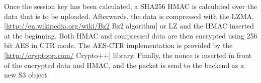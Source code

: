 \documentclass[letterpaper,10pt,english]{sphinxmanual}
\begin{document}
Once the session key has been calculated, a SHA256 HMAC is calculated
over the data that is to be uploaded. Afterwards, the data is
compressed with the LZMA, {[}\href{http://en.wikipedia.org/wiki/Bz2}{http://en.wikipedia.org/wiki/Bz2} Bz2
algorithm{]} or LZ and the HMAC inserted at the beginning. Both HMAC and
compressed data are then encrypted using 256 bit AES in CTR mode. The
AES-CTR implementation is provided by the {[}\href{http://cryptopp.com/}{http://cryptopp.com/}
Crypto++{]} library. Finally, the nonce is inserted in front of the
encrypted data and HMAC, and the packet is send to the backend as a
new S3 object.



\renewcommand{\indexname}{Index}
\printindex
\end{document}
